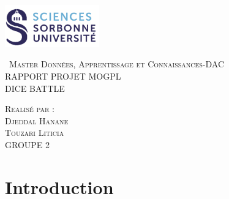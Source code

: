 \documentclass{article}
\begin{document}
\begin{titlepage}
    \begin{flushleft}
    \includegraphics[width=11em]{logo.png}\\[1.5cm]
    \end{flushleft}
    \begin{center}
        \textsc{{\LARGE \ Master Données, Apprentissage et Connaissances-DAC}}\\[4cm]
        \textsc{\Huge{RAPPORT PROJET MOGPL}}\\[1cm]
        \textsc{\Huge{DICE BATTLE}}\\[5.5cm]
        \begin{minipage}{1\textwidth}
            \begin{flushleft} \large
            \textsc{\LARGE{Realisé par :}}\\[0.5cm]
            \textsc{Djeddal Hanane}\\
            \textsc{Touzari Liticia}\\
            GROUPE 2\\
            \end{flushleft}
        \end{minipage}
        \vfill
    \end{center}
  \end{titlepage}
  
\maketitle
\tableofcontents					%


\newpage


\section{Introduction}
\end{document}

